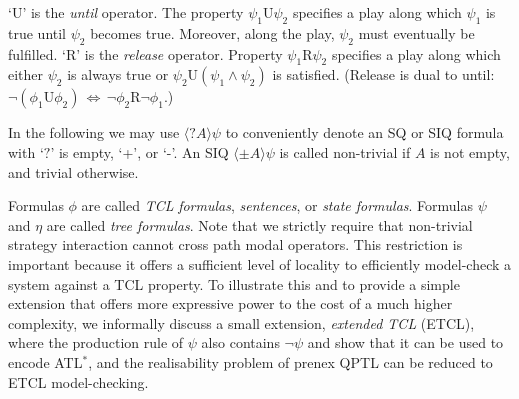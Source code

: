 \documentclass{llncs}
\newcommand{\until}{\textrm{U}} %
\newcommand{\rmrel}{\textrm{R}} %
\begin{document}

`$\until$' is the {\em until} operator.  
The property $\psi_1\until\psi_2$ specifies a play along which 
$\psi_1$ is true until $\psi_2$ becomes true.  
Moreover, along the play, $\psi_2$ must eventually be fulfilled.   
`$\rmrel$' is the {\em release} operator.  
Property $\psi_1\rmrel\psi_2$ specifies a play along which either 
$\psi_2$ is always true or $\psi_2\until(\psi_1\wedge\psi_2)$ 
is satisfied. (Release is dual to until: $\neg(\phi_1 \until \phi_2) \, \Leftrightarrow \, \neg \phi_2 \rmrel \neg \phi_1$.)

In the following we may use $\langle?A\rangle\psi$ to conveniently 
denote an SQ or SIQ formula with `$?$' is empty, `+', or `-'.  
An SIQ $\langle\pm A\rangle\psi$ is called non-trivial if 
$A$ is not empty, and trivial otherwise. 

Formulas $\phi$ are called {\em TCL} {\em formulas}, {\em sentences}, or 
{\em state formulas}.  
Formulas $\psi$ and $\eta$ are called {\em tree formulas}.  
Note that we strictly require that non-trivial strategy interaction cannot 
cross path modal operators.  
This restriction is important because it offers a sufficient level of locality to efficiently model-check a system against a TCL property.
To illustrate this and to provide a simple extension that offers more expressive power to the cost of a much higher complexity, we informally discuss a small extension,
\emph{extended TCL} (ETCL), where the production rule of $\psi$ also contains $\neg \psi$ and show that it can be used to encode ATL$^*$, and the realisability problem of prenex QPTL can be reduced to ETCL model-checking.

\end{document}

